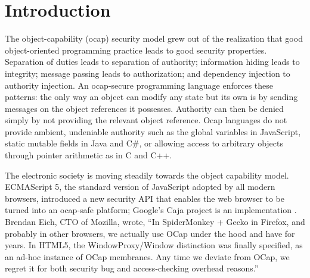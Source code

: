 \documentclass[submission,copyright,creativecommons]{eptcs}
\numberwithin{equation}{subsection}
\newenvironment{toc}
{
\begin{list}{}{
   \setlength{\leftmargin}{0.4in}
   \setlength{\rightmargin}{0.6in}
   \setlength{\parskip}{0pt}
 } \item }
{\end{list}}
\begin{document}


\section{Introduction}

The object-capability (ocap) security model grew out of the realization
that good object-oriented programming practice leads to good security properties.
Separation of duties leads to separation of authority; information hiding
leads to integrity; message passing leads to authorization; 
and dependency injection to authority injection.  An
ocap-secure programming language enforces these patterns: the only way an
object can modify any state but its own is by sending messages on the object
references it possesses.  Authority can then be denied simply by not providing
the relevant object reference. Ocap languages do not provide ambient, undeniable 
authority such as the global variables in JavaScript,
static mutable fields in Java and C\#, or allowing access to arbitrary objects
through pointer arithmetic as in C and C++.

The electronic society is moving steadily towards the object capability model.
ECMAScript 5, the standard version of JavaScript adopted by all modern
browsers, introduced a new security API that enables the web browser to
be turned into an ocap-safe platform; Google's Caja project is an implementation
\cite{Caja:2013}.  Brendan Eich, CTO of Mozilla, wrote, ``In SpiderMonkey + Gecko in 
Firefox, and probably in other browsers, we actually use OCap under the hood 
and have for years. In HTML5, the WindowProxy/Window distinction was finally 
specified, as an ad-hoc instance of OCap membranes.  Any time we deviate from 
OCap, we regret it for both security bug and access-checking overhead reasons.''
\cite{Eich:2013}
\end{document}
